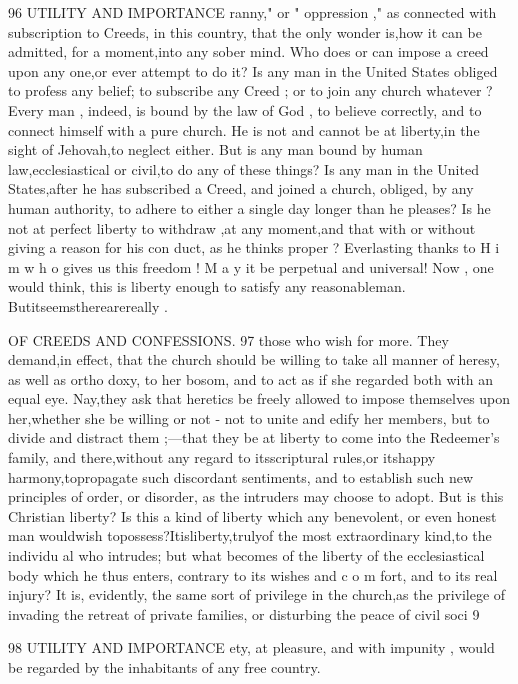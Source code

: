 \documentclass[
]{book}
\begin{document}
96 UTILITY AND IMPORTANCE
ranny," or " oppression ," as connected with
subscription to Creeds, in this country, that
the only wonder is,how it can be admitted, for a moment,into any sober mind. Who
does or can impose a creed upon any one,or ever attempt to do it? Is any man in the
United States obliged to profess any belief; to subscribe any Creed ; or to join any church
whatever ? Every man , indeed, is bound by the law of God , to believe correctly, and to connect himself with a pure church. He is
not and cannot be at liberty,in the sight of
Jehovah,to neglect either. But is any man
bound by human law,ecclesiastical or civil,to
do any of these things? Is any man in the
United States,after he has subscribed a Creed,
and joined a church, obliged, by any human
authority, to adhere to either a single day
longer than he pleases? Is he not at perfect
liberty to withdraw ,at any moment,and that
with or without giving a reason for his con duct, as he thinks proper ? Everlasting thanks
to H i m w h o gives us this freedom ! M a y it be perpetual and universal! Now , one would
think, this is liberty enough to satisfy any reasonableman. Butitseemstherearereally
.

OF CREEDS AND CONFESSIONS. 97
those who wish for more. They demand,in effect, that the church should be willing to
take all manner of heresy, as well as ortho doxy, to her bosom, and to act as if she
regarded both with an equal eye. Nay,they ask that heretics be freely allowed to impose
themselves upon her,whether she be willing or not - not to unite and edify her members, but to divide and distract them ;---that they be
at liberty to come into the Redeemer's family, and there,without any regard to itsscriptural
rules,or itshappy harmony,topropagate such discordant sentiments, and to establish such new principles of order, or disorder, as the intruders may choose to adopt. But is this Christian liberty? Is this a kind of liberty which any benevolent, or even honest man wouldwish topossess?Itisliberty,trulyof the most extraordinary kind,to the individu al who intrudes; but what becomes of the liberty of the ecclesiastical body which he thus enters, contrary to its wishes and c o m fort, and to its real injury? It is, evidently, the same sort of privilege in the church,as the privilege of invading the retreat of private families, or disturbing the peace of civil soci
9

98 UTILITY AND IMPORTANCE
ety, at pleasure, and with impunity , would be regarded by the inhabitants of any free country.
\end{document}
